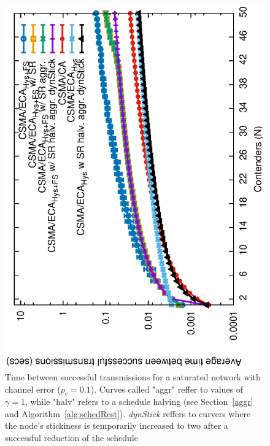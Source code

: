 	\begin{figure}[tb]
		\centering
		\includegraphics[width=0.7\linewidth,angle=-90]{figures/tonFigs/timeBetSxTx-sat-SR-TON.eps}
		\caption{Time between successful transmissions for a saturated network with channel error ($p_e=0.1$). Curves called "aggr" reffer to values of $\gamma=1$, while "halv" refers to a schedule halving (see Section~\ref{aggr} and Algorithm~\ref{alg:schedRest}). \emph{dynStick} reffers to curvers where the node's stickiness is temporarily increased to two after a successful reduction of the schedule}
		\label{fig:timeBetSxTx-sat-SR}
	\end{figure}
